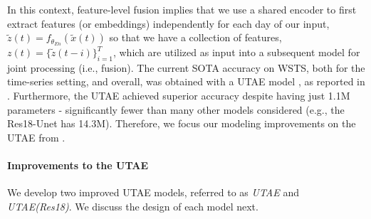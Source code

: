 In this context, feature-level fusion implies that we use a shared encoder to first extract features (or embeddings) independently for each day of our input, $\tilde{z}(t) = f_{\theta_{En}}(\tilde{x}(t))$ so that we have a collection of features, $z(t)=\{ \tilde{z}(t-i) \}_{i=1}^{T}$, which are utilized as input into a subsequent model for joint processing (i.e., fusion).  The current SOTA accuracy on WSTS, both for the time-series setting, and overall, was obtained with a UTAE model \cite{garnot2021panoptic}, as reported in \cite{gerard2023wildfirespreadts}. Furthermore, the UTAE achieved superior accuracy despite having just 1.1M parameters - significantly fewer than many other models considered (e.g., the Res18-Unet has 14.3M). Therefore, we focus our modeling improvements on the UTAE from \cite{gerard2023wildfirespreadts}. 


\paragraph{Improvements to the UTAE} We develop two improved UTAE models, referred to as \textit{UTAE} and \textit{UTAE(Res18)}.  We discuss the design of each model next. 

